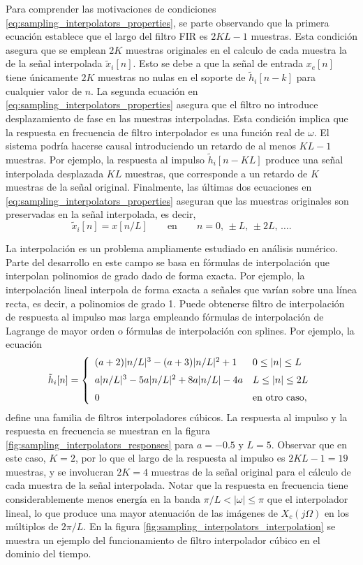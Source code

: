 \documentclass[a4paper]{report}
\begin{document}
Para comprender las motivaciones de condiciones \ref{eq:sampling_interpolators_properties}, se parte observando que la primera ecuación establece que el largo del filtro FIR es \(2KL-1\) muestras. Esta condición asegura que se emplean \(2K\) muestras originales en el calculo de cada muestra la de la señal interpolada \(\tilde{x}_i[n]\). Esto se debe a que la señal de entrada \(x_e[n]\) tiene únicamente \(2K\) muestras no nulas en el soporte de \(\tilde{h}_i[n-k]\) para cualquier valor de \(n\). La segunda ecuación en \ref{eq:sampling_interpolators_properties} asegura que el filtro no introduce desplazamiento de fase en las muestras interpoladas. Esta condición implica que la respuesta en frecuencia de filtro interpolador es una función real de \(\omega\). El sistema podría hacerse causal introduciendo un retardo de al menos \(KL-1\) muestras. Por ejemplo, la respuesta al impulso \(\tilde{h}_i[n-KL]\) produce una señal interpolada desplazada \(KL\) muestras, que corresponde a un retardo de \(K\) muestras de la señal original. Finalmente, las últimas dos ecuaciones en \ref{eq:sampling_interpolators_properties} aseguran que las muestras originales son preservadas en la señal interpolada, es decir,
\[
 \tilde{x}_i[n]=x[n/L]
 \qquad\textrm{en}\qquad
 n=0,\,\pm L,\,\pm 2L,\,\dots.
\]

La interpolación es un problema ampliamente estudiado en análisis numérico. Parte del desarrollo en este campo se basa en fórmulas de interpolación que interpolan polinomios de grado dado de forma exacta. Por ejemplo, la interpolación lineal interpola de forma exacta a señales que varían sobre una línea recta, es decir, a polinomios de grado 1. Puede obtenerse filtro de interpolación de respuesta al impulso mas larga empleando fórmulas de interpolación de Lagrange de mayor orden o fórmulas de interpolación con splines. Por ejemplo, la ecuación
\begin{equation}\label{eq:sampling_interpolators_cubic_impulse_response}
 \tilde{h}_i[n]=
 \left\{ 
 \begin{array}{ll}
  (a+2)|n/L|^3-(a+3)|n/L|^2+1 & 0\leq |n|\leq L\\[\medskipamount]
  a|n/L|^3-5a|n/L|^2+8a|n/L|-4a & L\leq |n|\leq 2L\\[\medskipamount]
  0 & \textrm{en otro caso},
 \end{array}
 \right.
\end{equation}
define una familia de filtros interpoladores cúbicos. La respuesta al impulso y la respuesta en frecuencia se muestran en la figura \ref{fig:sampling_interpolators_responses} para \(a=-0.5\) y \(L=5\). Observar que en este caso, \(K=2\), por lo que el largo de la respuesta al impulso es \(2KL-1=19\) muestras, y se involucran \(2K=4\) muestras de la señal original para el cálculo de cada muestra de la señal interpolada. Notar que la respuesta en frecuencia tiene considerablemente menos energía en la banda \(\pi/L<|\omega|\leq\pi\) que el interpolador lineal, lo que produce una mayor atenuación de las imágenes de \(X_c(j\Omega)\) en los múltiplos de \(2\pi/L\). En la figura \ref{fig:sampling_interpolators_interpolation} se muestra un ejemplo del funcionamiento de filtro interpolador cúbico en el dominio del tiempo.
\end{document}
